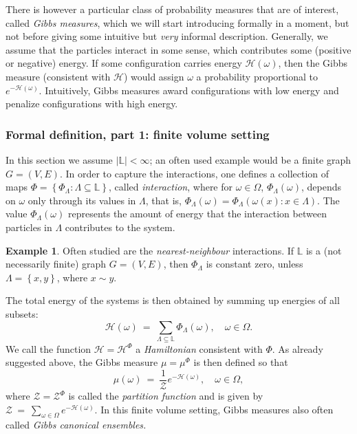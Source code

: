 \documentclass[12pt]{article}
\renewcommand{\H}{\mathcal{H}}
\renewcommand{\L}{\mathbb{L}}
\newcommand{\ZZ}{\mathcal{Z}}
\newcommand{\set}[1]{\left\{#1\right\}}
\newcommand{\1}{\mathbbm{1}}
\newcommand{\5}{\vspace{0.5cm}}
\theoremstyle{definition}
\newtheorem{ex}[thm]{Example}
\begin{document}
There is however a particular class of probability measures that are of interest, called \textit{Gibbs measures}, which we will start introducing formally in a moment, but not before giving some intuitive but \textit{very} informal description. Generally, we assume that the particles interact in some sense, which contributes some (positive or negative) energy. If some configuration carries energy $\H(\omega)$, then the Gibbs measure (consistent with $\H$) would assign $\omega$ a probability proportional to $e^{-\H(\omega)}$. Intuitively, Gibbs measures award configurations with low energy and penalize configurations with high energy. 


\subsubsection{Formal definition, part 1: finite volume setting}

In this section we assume $|\L|<\infty$; an often used example would be a finite graph $G=(V,E)$. In order to capture the interactions, one defines a collection of maps $\Phi=\set{\Phi_\Lambda:\Lambda\subseteq\L}$, called \textit{interaction}, where for $\omega\in\Omega$, $\Phi_\Lambda(\omega)$, depends on $\omega$ only through its values in $\Lambda$, that is, $\Phi_\Lambda(\omega)=\Phi_\Lambda(\omega(x):x\in\Lambda)$. The value $\Phi_\Lambda(\omega)$ represents the amount of energy that the interaction between particles in $\Lambda$ contributes to the system.

\begin{ex}
Often studied are the \textit{nearest-neighbour} interactions. If $\L$ is a (not necessarily finite) graph $G=(V,E)$, then $\Phi_\Lambda$ is constant zero, unless $\Lambda=\set{x,y}$, where $x\sim y$. 
\end{ex}

The total energy of the systems is then obtained by summing up energies of all subsets:
$$\H(\omega) ~=~ \sum_{\Lambda\subseteq \L}\Phi_\Lambda(\omega), \quad \omega\in\Omega.$$
We call the function $\H=\H^\Phi$ a \textit{Hamiltonian} consistent with $\Phi$. As already suggested above, the Gibbs measure $\mu=\mu^\Phi$ is then defined so that
$$\mu(\omega) ~=~ \frac{1}{\ZZ}e^{-\H(\omega)}, \quad \omega\in\Omega,$$
where $\ZZ=\ZZ^\Phi$ is called the \textit{partition function} and is given by $\ZZ ~=~ \sum_{\omega\in\Omega}e^{-\H(\omega)}.$ In this finite volume setting, Gibbs measures also often called \textit{Gibbs canonical ensembles.} \\
\end{document}
